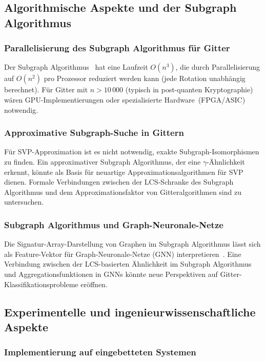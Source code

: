 ﻿\documentclass[a4paper,12pt]{article}
\theoremstyle{definition}
\begin{document}
\subsection{Algorithmische Aspekte und der Subgraph Algorithmus}

\subsubsection{Parallelisierung des Subgraph Algorithmus für Gitter}

Der Subgraph Algorithmus~\cite{Epp2026Subgraph} hat eine Laufzeit $O(n^3)$,
die durch Parallelisierung auf $O(n^2)$ pro Prozessor reduziert werden kann
(jede Rotation unabhängig berechnet).
Für Gitter mit $n > 10\,000$ (typisch in post-quanten Kryptographie)
wären GPU-Implementierungen oder spezialisierte Hardware~(FPGA/ASIC) notwendig.

\subsubsection{Approximative Subgraph-Suche in Gittern}

Für SVP-Approximation ist es nicht notwendig, exakte Subgraph-Isomorphismen zu finden.
Ein approximativer Subgraph Algorithmus, der eine $\gamma$-Ähnlichkeit erkennt,
könnte als Basis für neuartige Approximationsalgorithmen für SVP dienen.
Formale Verbindungen zwischen der LCS-Schranke des Subgraph Algorithmus
und dem Approximationsfaktor von Gitteralgorithmen sind zu untersuchen.

\subsubsection{Subgraph Algorithmus und Graph-Neuronale-Netze}

Die Signatur-Array-Darstellung von Graphen im Subgraph Algorithmus
lässt sich als Feature-Vektor für Graph-Neuronale-Netze (GNN) interpretieren~\cite{Xu2019}.
Eine Verbindung zwischen der LCS-basierten Ähnlichkeit im Subgraph Algorithmus
und Aggregationsfunktionen in GNNs könnte neue Perspektiven auf
Gitter-Klassifikationsprobleme eröffnen.

\subsection{Experimentelle und ingenieurwissenschaftliche Aspekte}

\subsubsection{Implementierung auf eingebetteten Systemen}
\end{document}

